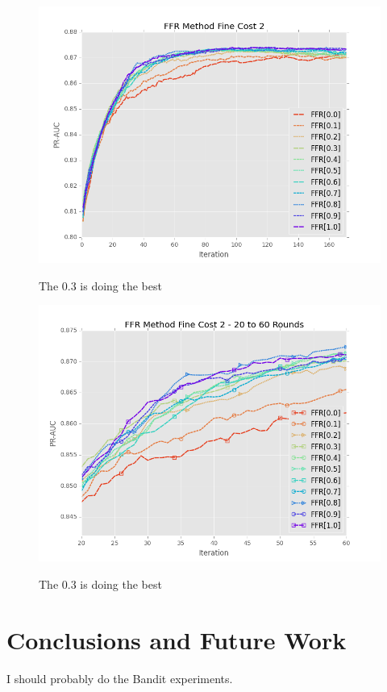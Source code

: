 \documentclass[ms]{nuthesis}
\begin{document}
\FloatBarrier
\begin{figure}[!htb]
	\centering
    \includegraphics[width=1.0\columnwidth]{fig/FFR_PR_Cost2_rnds0_171}
    \label{fig:FFR_PR_Cost2_rnds0_171}
    \caption{The 0.3 is doing the best}
\end{figure}
\FloatBarrier

\FloatBarrier
\begin{figure}[!htb]
	\centering
    \includegraphics[width=1.0\columnwidth]{fig/FFR_PR_Cost2_rnds20_60}
    \label{fig:FFR_PR_Cost2_rnds20_60}
    \caption{The 0.3 is doing the best}
\end{figure}
\FloatBarrier



\chapter{Conclusions and Future Work}\label{chap:math}
\par I should probably do the Bandit experiments.
\end{document}
